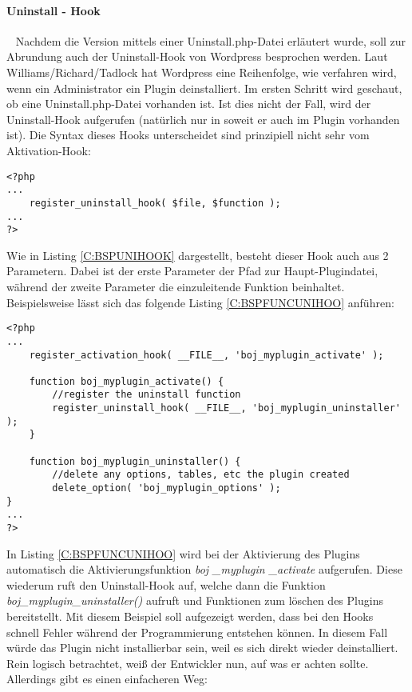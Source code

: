 \paragraph{Uninstall - Hook}\ \newline
Nachdem die Version mittels einer Uninstall.php-Datei erläutert wurde, soll zur Abrundung auch der Uninstall-Hook von Wordpress besprochen werden.\newline
Laut Williams/Richard/Tadlock hat Wordpress eine Reihenfolge, wie verfahren wird, wenn ein Administrator ein Plugin deinstalliert. Im ersten Schritt wird geschaut, ob eine Uninstall.php-Datei vorhanden ist. Ist dies nicht der Fall, wird der Uninstall-Hook aufgerufen (natürlich nur in soweit er auch im Plugin vorhanden ist). Die Syntax dieses Hooks unterscheidet sind prinzipiell nicht sehr vom Aktivation-Hook:
\begin{lstlisting}
<?php
...
	register_uninstall_hook( $file, $function );
...
?>
\end{lstlisting}
Wie in Listing \ref{C:BSPUNIHOOK} dargestellt, besteht dieser Hook auch aus 2 Parametern. Dabei ist der erste Parameter der Pfad zur Haupt-Plugindatei, während der zweite Parameter die einzuleitende Funktion beinhaltet. Beispielsweise lässt sich das folgende Listing \ref{C:BSPFUNCUNIHOO} anführen:
\begin{lstlisting}
<?php
...
	register_activation_hook( __FILE__, 'boj_myplugin_activate' );

	function boj_myplugin_activate() {
		//register the uninstall function
		register_uninstall_hook( __FILE__, 'boj_myplugin_uninstaller' );
	}

	function boj_myplugin_uninstaller() {
		//delete any options, tables, etc the plugin created 
		delete_option( 'boj_myplugin_options' );
}
...
?>
\end{lstlisting}
In Listing \ref{C:BSPFUNCUNIHOO} wird bei der Aktivierung des Plugins automatisch die Aktivierungsfunktion \emph{boj \_myplugin \_activate} aufgerufen. Diese wiederum ruft den Uninstall-Hook auf, welche dann die Funktion \emph{boj\_myplugin\_uninstaller()} aufruft und Funktionen zum löschen des Plugins bereitstellt. Mit diesem Beispiel soll aufgezeigt werden, dass bei den Hooks schnell Fehler während der Programmierung entstehen können. In diesem Fall würde das Plugin nicht installierbar sein, weil es sich direkt wieder deinstalliert. Rein logisch betrachtet, weiß der Entwickler nun, auf was er achten sollte. Allerdings gibt es einen einfacheren Weg:\newline

